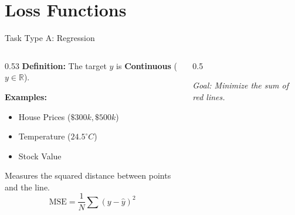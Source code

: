 \section{Loss Functions}
\begin{frame}{Task Type A: Regression}
    \begin{columns}[c]
        \begin{column}{0.53\textwidth}
            \textbf{Definition:}
            The target $y$ is \textbf{Continuous} ($y \in \mathbb{R}$).
            
            \vspace{1em}
            \textbf{Examples:}
            \begin{itemize}
                \item House Prices ($\$300k, \$500k$)
                \item Temperature ($24.5^\circ C$)
                \item Stock Value
            \end{itemize}

            \vspace{1em}
            \begin{tcolorbox}[colback=blue!5, title=The Loss: Mean Squared Error]
                Measures the squared distance between points and the line.
                $$ \text{MSE} = \frac{1}{N} \sum (y - \hat{y})^2 $$
            \end{tcolorbox}
        \end{column}

        \begin{column}{0.5\textwidth}
            \centering
            \vspace{0.5em}
            \small \textit{Goal: Minimize the sum of red lines.}
        \end{column}
    \end{columns}
\end{frame}

